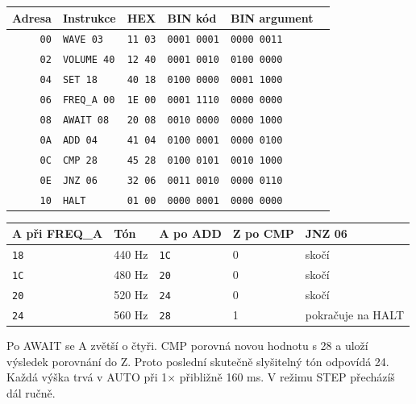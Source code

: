\documentclass[11pt,a4paper]{article}
\newcommand{\sub}[1]{\par\vspace{2mm}{\sffamily\bfseries\large #1\par}\nobreak}
\begin{document}
{\small\begin{tabularx}{\linewidth}{@{}rllllX@{}}\toprule
\textbf{Adresa} & \textbf{Instrukce} & \textbf{HEX} & \textbf{BIN kód} & \textbf{BIN argument} & \textbf{}\\\midrule
\texttt{00} & \texttt{WAVE 03} & \texttt{11 03} & \texttt{0001 0001} & \texttt{0000 0011} & \\
\texttt{02} & \texttt{VOLUME 40} & \texttt{12 40} & \texttt{0001 0010} & \texttt{0100 0000} & \\
\texttt{04} & \texttt{SET 18} & \texttt{40 18} & \texttt{0100 0000} & \texttt{0001 1000} & \\
\texttt{06} & \texttt{FREQ\_A 00} & \texttt{1E 00} & \texttt{0001 1110} & \texttt{0000 0000} & \\
\texttt{08} & \texttt{AWAIT 08} & \texttt{20 08} & \texttt{0010 0000} & \texttt{0000 1000} & \\
\texttt{0A} & \texttt{ADD 04} & \texttt{41 04} & \texttt{0100 0001} & \texttt{0000 0100} & \\
\texttt{0C} & \texttt{CMP 28} & \texttt{45 28} & \texttt{0100 0101} & \texttt{0010 1000} & \\
\texttt{0E} & \texttt{JNZ 06} & \texttt{32 06} & \texttt{0011 0010} & \texttt{0000 0110} & \\
\texttt{10} & \texttt{HALT} & \texttt{01 00} & \texttt{0000 0001} & \texttt{0000 0000} & \\
\bottomrule\end{tabularx}}\par
\sub{Sleduj registry při STEP}
{\small\begin{tabularx}{\linewidth}{@{}llllX@{}}\toprule
\textbf{A při FREQ\_A} & \textbf{Tón} & \textbf{A po ADD} & \textbf{Z po CMP} & \textbf{JNZ 06}\\\midrule
\texttt{18} & 440 Hz & \texttt{1C} & 0 & skočí\\
\texttt{1C} & 480 Hz & \texttt{20} & 0 & skočí\\
\texttt{20} & 520 Hz & \texttt{24} & 0 & skočí\\
\texttt{24} & 560 Hz & \texttt{28} & 1 & pokračuje na HALT\\
\bottomrule\end{tabularx}}\par
Po AWAIT se A zvětší o čtyři. CMP porovná novou hodnotu s 28 a uloží výsledek porovnání do Z. Proto poslední skutečně slyšitelný tón odpovídá 24. Každá výška trvá v AUTO při 1\ensuremath{\times} přibližně 160 ms. V režimu STEP přecházíš dál ručně.
\end{document}
